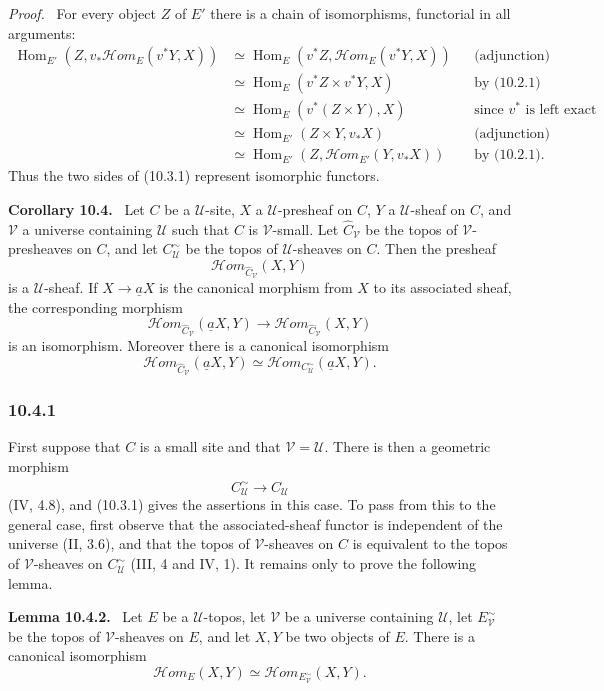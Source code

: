 \documentclass[11pt]{article}
\newcommand{\U}{\mathcal{U}}
\newcommand{\V}{\mathcal{V}}
\newcommand{\Hom}{\operatorname{Hom}}
\newcommand{\scrHom}{\mathscr{H}\!om}
\newcommand{\wh}[1]{\widehat{#1}}
\newenvironment{statement}[1]{\par\medskip\noindent\textbf{#1.}\ }{\par\medskip}
\newenvironment{prooftext}{\par\noindent\emph{Proof.}\ }{\par\medskip}
\begin{document}
\begin{prooftext}
For every object $Z$ of $E'$ there is a chain of isomorphisms, functorial in all arguments:
\begin{align*}
\Hom_{E'}(Z,v_*\scrHom_E(v^*Y,X))
&\simeq \Hom_E(v^*Z,\scrHom_E(v^*Y,X)) &&\text{(adjunction)}\\
&\simeq \Hom_E(v^*Z\times v^*Y,X) &&\text{by (10.2.1)}\\
&\simeq \Hom_E(v^*(Z\times Y),X) &&\text{since $v^*$ is left exact}\\
&\simeq \Hom_{E'}(Z\times Y,v_*X) &&\text{(adjunction)}\\
&\simeq \Hom_{E'}(Z,\scrHom_{E'}(Y,v_*X)) &&\text{by (10.2.1).}
\end{align*}
Thus the two sides of (10.3.1) represent isomorphic functors.
\end{prooftext}

\begin{statement}{Corollary 10.4}
Let $C$ be a $\U$-site, $X$ a $\U$-presheaf on $C$, $Y$ a $\U$-sheaf on $C$, and $\V$ a universe containing $\U$ such that $C$ is $\V$-small. Let $\wh C_{\V}$ be the topos of $\V$-presheaves on $C$, and let $C^{\sim}_{\U}$ be the topos of $\U$-sheaves on $C$. Then the presheaf
\[
\scrHom_{\wh C_{\V}}(X,Y)
\]
is a $\U$-sheaf. If $X\to \underline{a}X$ is the canonical morphism from $X$ to its associated sheaf, the corresponding morphism
\[
\scrHom_{\wh C_{\V}}(\underline{a}X,Y)\longrightarrow \scrHom_{\wh C_{\V}}(X,Y)
\]
is an isomorphism. Moreover there is a canonical isomorphism
\[
\scrHom_{\wh C_{\V}}(\underline{a}X,Y)\simeq \scrHom_{C^{\sim}_{\U}}(\underline{a}X,Y).
\]
\end{statement}

\subsubsection*{10.4.1}
First suppose that $C$ is a small site and that $\V=\U$. There is then a geometric morphism
\[
C^{\sim}_{\U}\longrightarrow \wh C_{\U}
\]
(IV, 4.8), and (10.3.1) gives the assertions in this case. To pass from this to the general case, first observe that the associated-sheaf functor is independent of the universe (II, 3.6), and that the topos of $\V$-sheaves on $C$ is equivalent to the topos of $\V$-sheaves on $C^{\sim}_{\U}$ (III, 4 and IV, 1). It remains only to prove the following lemma.

\begin{statement}{Lemma 10.4.2}
Let $E$ be a $\U$-topos, let $\V$ be a universe containing $\U$, let $E^{\sim}_{\V}$ be the topos of $\V$-sheaves on $E$, and let $X,Y$ be two objects of $E$. There is a canonical isomorphism
\[
\scrHom_E(X,Y)\simeq \scrHom_{E^{\sim}_{\V}}(X,Y).
\]
\end{statement}
\end{document}
